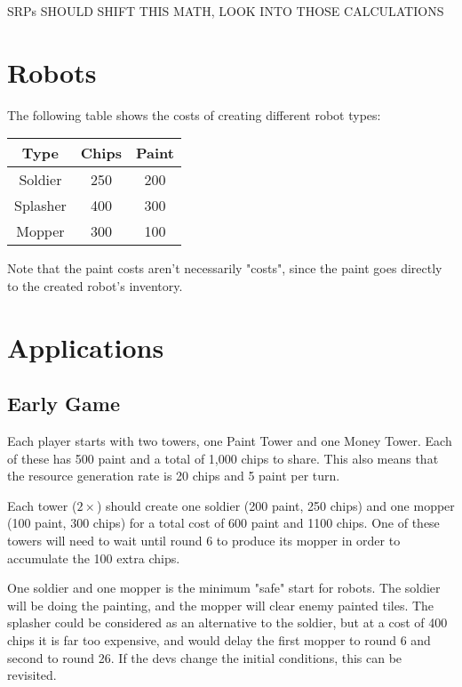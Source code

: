 \documentclass{article}
\begin{document}
  \begin{center}
    SRPs SHOULD SHIFT THIS MATH, LOOK INTO THOSE CALCULATIONS
  \end{center}

  \section*{Robots}

  The following table shows the costs of creating different robot types:

  \begin{center}
    \begin{tabular}{c | c | c}
      Type & Chips & Paint \\
      \hline
      Soldier & 250 & 200 \\
      Splasher & 400 & 300 \\
      Mopper & 300 & 100
    \end{tabular}
  \end{center}

  Note that the paint costs aren't necessarily "costs", since the paint goes directly to the created robot's inventory.

  \section*{Applications}

  \subsection*{Early Game}
  Each player starts with two towers, one Paint Tower and one Money Tower. Each of these has 500 paint and a total of 1,000 chips to share. This also means that the resource generation rate is 20 chips and 5 paint per turn.

  \medskip

  Each tower ($2 \times$) should create one soldier (200 paint, 250 chips) and one mopper (100 paint, 300 chips) for a total cost of 600 paint and 1100 chips. One of these towers will need to wait until round 6 to produce its mopper in order to accumulate the 100 extra chips.

  \medskip

  One soldier and one mopper is the minimum "safe" start for robots. The soldier will be doing the painting, and the mopper will clear enemy painted tiles. The splasher could be considered as an alternative to the soldier, but at a cost of 400 chips it is far too expensive, and would delay the first mopper to round 6 and second to round 26. If the devs change the initial conditions, this can be revisited.
\end{document}
